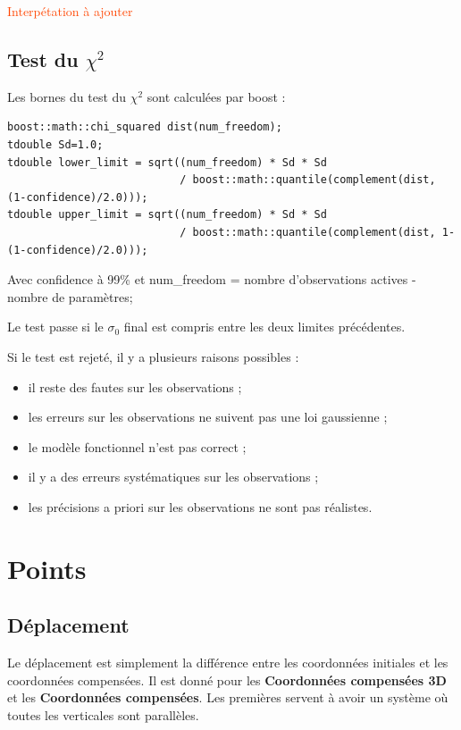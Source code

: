 \documentclass[french]{report}
\newcommand{\revoir}[1]{\textcolor{OrangeRed}{#1}}
\begin{document}
\revoir{Interpétation à ajouter}



\subsection{Test du $\chi^2$}

Les bornes du test du $\chi^2$ sont calculées par boost :
\begin{verbatim}
boost::math::chi_squared dist(num_freedom);
tdouble Sd=1.0;
tdouble lower_limit = sqrt((num_freedom) * Sd * Sd
                           / boost::math::quantile(complement(dist, (1-confidence)/2.0)));
tdouble upper_limit = sqrt((num_freedom) * Sd * Sd
                           / boost::math::quantile(complement(dist, 1-(1-confidence)/2.0)));
\end{verbatim}

Avec confidence à 99\% et num\_freedom = nombre d'observations actives - nombre de paramètres;

Le test passe si le $\sigma_0$ final est compris entre les deux limites précédentes.


Si le test est rejeté, il y a plusieurs raisons possibles :
\begin{itemize}
\item il reste des fautes sur les observations ;
\item les erreurs sur les observations ne suivent pas une loi gaussienne ;
\item le modèle fonctionnel n'est pas correct ;
\item il y a des erreurs systématiques sur les observations ;
\item les précisions a priori sur les observations ne sont pas réalistes.
\end{itemize}



\section{Points}


\subsection{Déplacement}
Le déplacement est simplement la différence entre les coordonnées initiales et les coordonnées compensées.
Il est donné pour les \textbf{Coordonnées compensées 3D} et les \textbf{Coordonnées compensées}.
Les premières servent à avoir un système où toutes les verticales sont parallèles.
\end{document}
